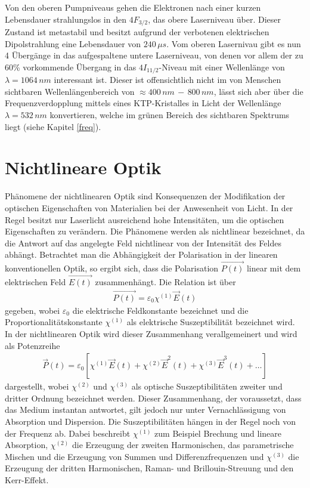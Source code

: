 \documentclass[twoside,colorback,accentcolor=tud4c,11pt]{tudreport}
\begin{document}
Von den oberen Pumpniveaus gehen die Elektronen nach einer kurzen Lebensdauer strahlungslos in den $4F_{3/2}$, das obere Laserniveau über. Dieser Zustand ist metastabil und besitzt aufgrund der verbotenen elektrischen Dipolstrahlung eine Lebensdauer von $240\,\si{\mu s}$. Vom oberen Lasernivau gibt es nun 4 Übergänge in das aufgespaltene untere Laserniveau, von denen vor allem der zu 60\% vorkommende Übergang in das $4I_{11/2}$-Niveau mit einer Wellenlänge von $\lambda=1064\,\si{nm}$ interessant ist. Dieser ist offensichtlich nicht im von Menschen sichtbaren Wellenlängenbereich von $\approx 400\,\si{nm}\,-\, 800\,\si{nm}$, lässt sich aber über die Frequenzverdopplung mittels eines KTP-Kristalles in Licht der Wellenlänge $\lambda=532\,\si{nm}$ konvertieren, welche im grünen Bereich des sichtbaren Spektrums liegt (siehe Kapitel \ref{freq}). \cite{2,4,5}
\section{Nichtlineare Optik}
Phänomene der nichtlinearen Optik sind Konsequenzen der Modifikation der optischen Eigenschaften von Materialien bei der Anwesenheit von Licht. In der Regel besitzt nur Laserlicht ausreichend hohe Intensitäten, um die optischen Eigenschaften zu verändern. Die Phänomene werden als nichtlinear bezeichnet, da die Antwort auf das angelegte Feld nichtlinear von der Intensität des Feldes abhängt. Betrachtet man die Abhängigkeit der Polarisation in der linearen konventionellen Optik, so ergibt sich, dass die Polarisation $\vec{P(t)}$ linear mit dem elektrischen Feld $\vec{E(t)}$ zusammenhängt. Die Relation ist über 
\begin{align*}
\vec{P(t)}=\varepsilon_0\chi^{(1)}\vec{E}(t)
\end{align*}
gegeben, wobei $\varepsilon_0$ die elektrische Feldkonstante bezeichnet und die Proportionalitätskonstante $\chi^{(1)}$ als elektrische Suszeptibilität bezeichnet wird. In der nichtlinearen Optik wird dieser Zusammenhang verallgemeinert und wird als Potenzreihe
\begin{align*}
\vec{P}(t)=\varepsilon_0 \left[ \chi^{(1)} \vec{E}(t) + \chi^{(2)} \vec{E}^2(t) +  \chi^{(3)}\vec{E}^3(t) + \dots \right]
\end{align*} 
dargestellt, wobei $\chi^{(2)}$ und $\chi^{(3)}$ als optische Suszeptibilitäten zweiter und dritter Ordnung bezeichnet werden. Dieser Zusammenhang, der voraussetzt, dass das Medium instantan antwortet, gilt jedoch nur unter Vernachlässigung von Absorption und Dispersion. Die Suszeptibilitäten hängen in der Regel noch von der Frequenz ab. Dabei beschreibt $\chi^{(1)}$ zum Beispiel Brechung und lineare Absorption, $\chi^{(2)}$ die Erzeugung der zweiten Harmonischen, das parametrische Mischen und die Erzeugung von Summen und Differenzfrequenzen und $\chi^{(3)}$ die Erzeugung der dritten Harmonischen, Raman- und Brillouin-Streuung und den Kerr-Effekt. \cite{2,6}
\end{document}
